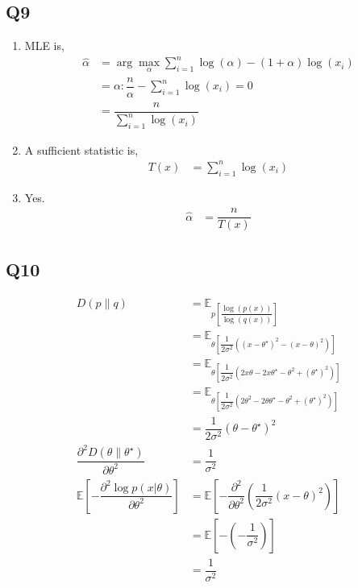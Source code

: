 \documentclass{article}
\begin{document}
\subsection{Q9}
\begin{enumerate}
\item MLE is,
\begin{align*}
\hat{\alpha} &= \arg\displaystyle\max_{\alpha} \displaystyle\sum_{i=1}^{n} \log\left(\alpha\right) - \left(1+\alpha\right) \log\left(x_{i}\right)
\\ &= \alpha : \dfrac{n}{\alpha} - \displaystyle\sum_{i=1}^{n} \log\left(x_{i}\right) = 0
\\ &= \dfrac{n}{\displaystyle\sum_{i=1}^{n} \log\left(x_{i}\right)}
\end{align*}
\item A sufficient statistic is,
\begin{align*}
T\left(x\right)  &= \displaystyle\sum_{i=1}^{n} \log\left(x_{i}\right)
\end{align*}
\item Yes.
\begin{align*}
\hat{\alpha} &= \dfrac{n}{T\left(x\right)}
\end{align*}
\end{enumerate}


\subsection{Q10}
\begin{align*}
D\left(p \| q\right)  &= \mathbb{E}_{p\left[\dfrac{\log\left(p\left(x\right)\right)}{\log\left(q\left(x\right)\right)}\right]}
\\ &= \mathbb{E}_{\theta\left[\dfrac{1}{2 \sigma^{2}} \left(\left(x - \theta^\star \right)^{2} - \left(x - \theta\right)^{2}\right)\right]}
\\ &= \mathbb{E}_{\theta\left[\dfrac{1}{2 \sigma^{2}} \left(2 x \theta - 2 x \theta^\star  - \theta^{2} + \left(\theta^\star \right)^{2}\right)\right]}
\\ &= \mathbb{E}_{\theta\left[\dfrac{1}{2 \sigma^{2}} \left(2 \theta^{2} - 2 \theta \theta^\star  - \theta^{2} + \left(\theta^\star \right)^{2}\right)\right]}
\\ &= \dfrac{1}{2 \sigma^{2}} \left(\theta - \theta^\star \right)^{2}
\\ \dfrac{\partial^2 D\left(\theta \| \theta^\star \right) }{\partial \theta^2} &= \dfrac{1}{\sigma^{2}}
\\ \mathbb{E}\left[- \dfrac{\partial^2 \log p\left(x | \theta\right)}{\partial \theta^2}\right] &= \mathbb{E}\left[- \dfrac{\partial^2 }{\partial \theta^2} \left(\dfrac{1}{2 \sigma^{2}} \left(x - \theta\right)^{2}\right)\right]
\\ &= \mathbb{E}\left[- \left(- \dfrac{1}{\sigma^{2}}\right)\right]
\\ &= \dfrac{1}{\sigma^{2}}
\end{align*}
\end{document}
